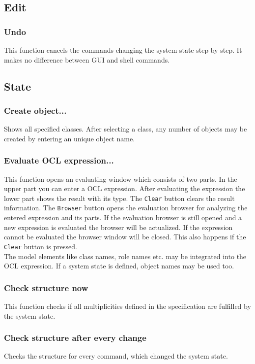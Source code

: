 \documentclass[a4paper,titlepage,oneside,final]{scrreprt} %
\begin{document}
\subsection{Edit}
\subsubsection{Undo}\label{undo}
This function cancels the commands changing the system state step by step.
It makes no difference between GUI and shell commands.
\subsection{State}
\subsubsection{Create object...}
Shows all specified classes. After selecting a class,
any number of objects may be created by entering an unique object name.
\subsubsection{Evaluate OCL expression...}\label{evalExpr}
This function opens an evaluating window which consists of two parts.
In the upper part you can enter a OCL expression.
After evaluating the expression the lower part
shows the result with its type. The \verb+Clear+ button
clears the result information.
The \verb+Browser+ button opens the
evaluation browser for analyzing the entered expression and
its parts. If the evaluation browser is still opened and a new
expression is evaluated the browser will be actualized. If the
expression cannot be evaluated the browser window will be closed.
This also happens if the \verb+Clear+ button
is pressed.\\
The model elements like class names, role names
etc. may be integrated into the OCL expression.
If a system state is defined, object names may be used too.
\subsubsection{Check structure now}
This function checks if all multiplicities defined in the specification
are fulfilled by the system state.
\subsubsection{Check structure after every change}
Checks the structure for every command, which changed the system state.
\end{document}
